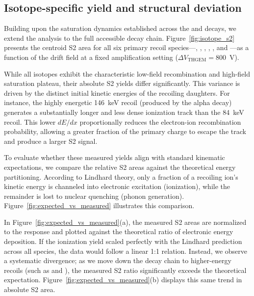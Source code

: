 \subsection{Isotope-specific yield and structural deviation}

Building upon the saturation dynamics established across the  and
 decays, we extend the analysis to the full accessible decay chain.
Figure~\ref{fig:isotope_s2} presents the centroid S2 area for all six primary recoil
species—, , , ,
, and —as a function of the drift field at a fixed amplification
setting ($\Delta V_{\text{THGEM}} = 800$~V).

While all isotopes exhibit the characteristic low-field recombination and high-field saturation
plateau, their absolute S2 yields differ significantly. This variance is driven by the distinct
initial kinetic energies of the recoiling daughters. For instance, the highly energetic 146~keV
 recoil (produced by the  alpha decay) generates a substantially
longer and less dense ionization track than the 84~keV  recoil. This lower $dE/dx$
proportionally reduces the electron-ion recombination probability, allowing a greater fraction of
the primary charge to escape the track and produce a larger S2 signal.

To evaluate whether these measured yields align with standard kinematic expectations, we compare
the relative S2 areas against the theoretical energy partitioning. According to Lindhard theory,
only a fraction of a recoiling ion's kinetic energy is channeled into electronic excitation
(ionization), while the remainder is lost to nuclear quenching (phonon generation).
Figure~\ref{fig:expected_vs_measured} illustrates this comparison.

In Figure~\ref{fig:expected_vs_measured}(a), the measured S2 areas are normalized to the
 response and plotted against the theoretical ratio of electronic energy
deposition. If the ionization yield scaled perfectly with the Lindhard prediction across all
species, the data would follow a linear 1:1 relation. Instead, we observe a systematic divergence;
as we move down the decay chain to higher-energy recoils (such as  and
), the measured S2 ratio significantly exceeds the theoretical expectation.
Figure~\ref{fig:expected_vs_measured}(b) displays this same trend in absolute S2 area.

